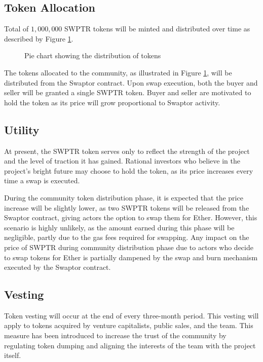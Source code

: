 \documentclass[12pt]{article}
\begin{document}
  \subsection{Token Allocation}

  Total of $1,000,000$ SWPTR tokens will be minted and distributed over time as described by Figure \ref{fig:pie-chart}.

\begin{figure}[h]
  \centering
  \caption{Pie chart showing the distribution of tokens}
  \label{fig:pie-chart}
\end{figure}

The tokens allocated to the community, as illustrated in Figure \ref{fig:pie-chart}, will be distributed from the Swaptor contract.
Upon swap execution, both the buyer and seller will be granted a single SWPTR token.
Buyer and seller are motivated to hold the token as its price will grow proportional to Swaptor activity.

\subsection{Utility}
At present, the SWPTR token serves only to reflect the strength of the
project and the level of traction it has gained. Rational investors
who believe in the project's bright future may choose to hold the
token, as its price increases every time a swap is executed.

During the community token distribution phase, it is expected that
the price increase will be slightly lower, as two SWPTR tokens will
be released from the Swaptor contract, giving actors the option to swap
them for Ether. However, this scenario is highly unlikely, as the
amount earned during this phase will be negligible, partly due to
the gas fees required for swapping. Any impact on the price of SWPTR during
community distribution phase due to actors who decide to swap tokens
for Ether is partially dampened by the swap and burn mechanism executed
by the Swaptor contract.

\subsection{Vesting}
Token vesting will occur at the end of every three-month period.
This vesting will apply to tokens acquired by venture capitalists,
public sales, and the team. This measure has been introduced to
increase the trust of the community by regulating token dumping and
aligning the interests of the team with the project itself.
\end{document}
